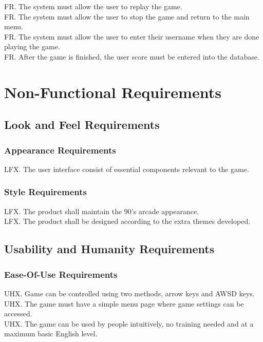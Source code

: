 \documentclass[12pt]{article}
\begin{document}
FR. The system must allow the user to replay the game. \\

FR. The system must allow the user to stop the game and return to the main menu. \\

FR. The system must allow the user to enter their username when they are done playing the game. \\

FR. After the game is finished, the user score must be entered into the database. \\



\section{Non-Functional Requirements}
    \subsection{Look and Feel Requirements}
        \subsubsection{Appearance Requirements}
        LFX. The user interface consist of essential components relevant to the game.
        \subsubsection{Style Requirements} 
    	LFX. The product shall maintain the 90's arcade appearance.\\
    	LFX. The product shall be designed according to the extra themes developed.
   
\subsection{Usability and Humanity Requirements}
    \subsubsection{Ease-Of-Use Requirements}
    UHX. Game can be controlled using two methods, arrow keys and AWSD keys.\\
    UHX. The game must have a simple menu page where game settings can be accessed.\\
    UHX. The game can be used by people intuitively, no training needed and at a maximum basic English level.
    
\end{document}
